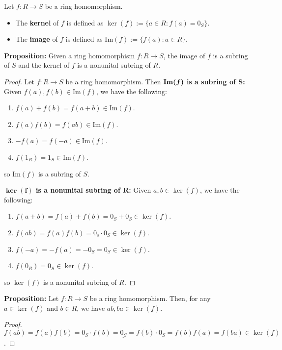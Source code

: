 \documentclass [12pt] {article}
\newenvironment{definition}[1]{\begin{tcolorbox}[title={Definition: #1},colback=blue!5!white,colframe=black!75!blue]}{\end{tcolorbox}}
\renewcommand{\bf}[1]{\textbf{{#1}}}
\newcommand{\ul}[1]{\underline{{#1}}}
\renewcommand{\Im}{\text{Im}}
\begin{document}
\begin{definition}{Kernel and Image}
    Let $f : R \to S$ be a ring homomorphism. 
    \begin{itemize}[label=$\to$, leftmargin=*, itemsep=0em]
        \item The \bf{kernel} of $f$ is defined as $\ker(f) := \{ a \in R : f(a) = 0_S \}$.
        \item The \bf{image} of $f$ is defined as $\Im(f) := \{ f(a) : a \in R \}$.
    \end{itemize}
\end{definition}
\bf{Proposition:} Given a ring homomorphism $f : R \to S$, the image of $f$ is a subring of $S$
and the kernel of $f$ is a nonunital subring of $R$.
\begin{proof}
    Let $f : R \to S$ be a ring homomorphism. Then
    \newline
    $\bm{\bf{\Im}(f)}$ \bf{is a subring of $\bm{S}$:} 
    Given $f(a), f(b) \in \Im(f)$, we have the following:
    \begin{enumerate}[label=(\arabic*)]
        \item $f(a) + f(b) = f(a + b) \in \Im(f)$.
        \item $f(a)f(b) = f(ab) \in \Im(f)$.
        \item $-f(a) = f(-a) \in \Im(f)$.
        \item $f(1_R) = 1_S \in \Im(f)$.    
    \end{enumerate}
    so $\Im(f)$ is a subring of $S$.
    \vspace{1em}

    \bf{$\bm{\ker(f)}$ is a nonunital subring of $\bm{R}$:}
    Given $a, b \in \ker(f)$, we have the following:
    \begin{enumerate}[label=(\arabic*)]
        \item $f(a + b) = f(a) + f(b) = 0_S + 0_S \in \ker(f)$.
        \item $f(ab) = f(a)f(b) = 0_s \cdot 0_S \in \ker(f)$.
        \item $f(-a) = -f(a) = -0_S = 0_S \in \ker(f)$. 
        \item $f(0_R) = 0_S \in \ker(f)$.
    \end{enumerate}
    so $\ker(f)$ is a nonunital subring of $R$.
\end{proof}
\bf{Proposition:} Let $f : R \to S$ be a ring homomorphism. Then, for any $a \in \ker(f)$ and 
$b \in R$, we have $ab, ba \in \ker(f)$.
\begin{proof}
    $\ul{f(ab)} = f(a)f(b) = 0_S \cdot f(b) = \ul{0_S} = f(b) \cdot 0_S = f(b)f(a) = \ul{f(ba)} \in \ker(f)$.
\end{proof}
\end{document}
